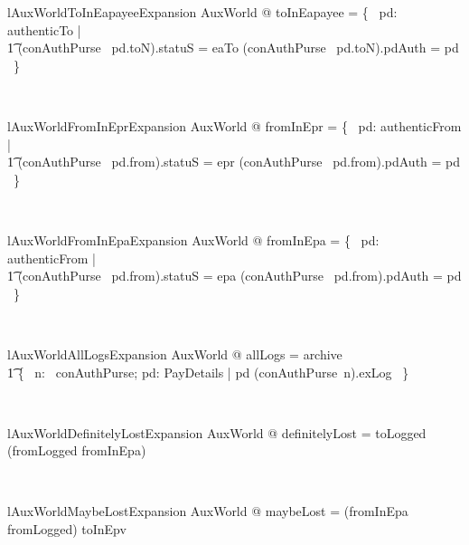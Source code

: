 \begin{LNewLemma}
\begin{theorem}{lAuxWorldToInEapayeeExpansion}
    \forall  AuxWorld @ toInEapayee = \{~ pd: authenticTo | \\
        \t1 (conAuthPurse~ pd.toN).statuS = eaTo \land (conAuthPurse~ pd.toN).pdAuth = pd ~\}
\end{theorem}~\end{LNewLemma}

\begin{LNewLemma}
\begin{theorem}{lAuxWorldFromInEprExpansion}
    \forall  AuxWorld @ fromInEpr = \{~  pd: authenticFrom | \\
        \t1 (conAuthPurse~ pd.from).statuS = epr \land (conAuthPurse~ pd.from).pdAuth = pd ~\}
\end{theorem}~\end{LNewLemma}

\begin{LNewLemma}
\begin{theorem}{lAuxWorldFromInEpaExpansion}
    \forall  AuxWorld @ fromInEpa = \{~  pd: authenticFrom | \\
        \t1 (conAuthPurse~ pd.from).statuS = epa \land  (conAuthPurse~ pd.from).pdAuth = pd ~\}
\end{theorem}~\end{LNewLemma}

\begin{LNewLemma}
\begin{theorem}{lAuxWorldAllLogsExpansion}
    \forall  AuxWorld @ allLogs = archive \cup \\
        \t1 \{~ n: \dom~conAuthPurse; pd: PayDetails | pd \in (conAuthPurse~n).exLog ~\}
\end{theorem}~\end{LNewLemma}

\begin{LNewLemma}
\begin{theorem}{lAuxWorldDefinitelyLostExpansion}
    \forall AuxWorld @ definitelyLost = toLogged \cap (fromLogged \cup  fromInEpa)
\end{theorem}~\end{LNewLemma}

\begin{LNewLemma}
\begin{theorem}{lAuxWorldMaybeLostExpansion}
    \forall AuxWorld @ maybeLost = (fromInEpa \cup  fromLogged) \cap  toInEpv
\end{theorem}~\end{LNewLemma}

